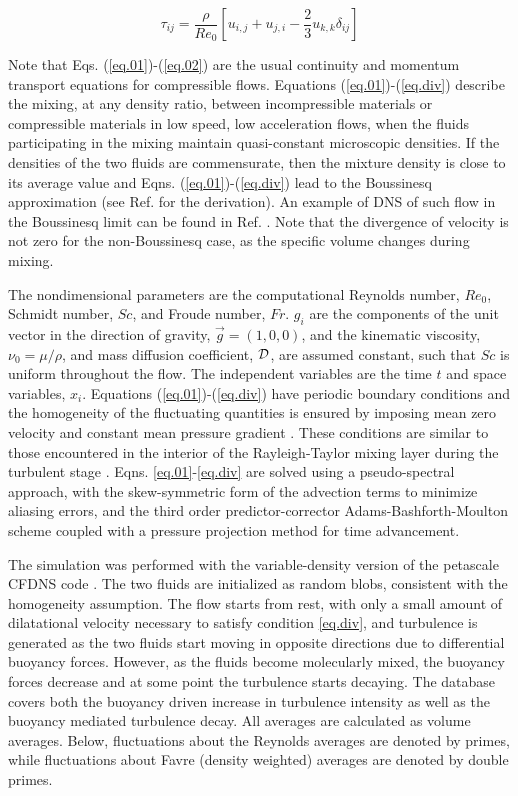 \documentclass[11pt]{article}
\def\twothird{\frac{2}{3}}
\begin{document}
\begin{equation}
\tau_{ij}=\frac{\rho}{Re_0}
[u_{i,j}+u_{j,i}-\twothird u_{k,k}\delta_{ij}]
\end{equation}

\noindent
Note that Eqs. (\ref{eq.01})-(\ref{eq.02}) are the usual continuity and 
momentum transport equations for compressible flows. Equations
(\ref{eq.01})-(\ref{eq.div}) describe the mixing, at any density ratio, between
incompressible materials or compressible materials in low speed, low 
acceleration flows, when the fluids participating in the mixing maintain 
quasi-constant microscopic densities. If the densities of the two fluids are 
commensurate, then the mixture density is close to its average value and 
Eqns. (\ref{eq.01})-(\ref{eq.div}) lead to the Boussinesq approximation
(see Ref. \cite{LR07} for the derivation). An example of DNS of such flow in 
the Boussinesq limit can be found in Ref. \cite{BCC92}. Note that the 
divergence of velocity is not zero for the non-Boussinesq case, as the specific
volume changes during mixing. 

The nondimensional parameters are the computational Reynolds number, $Re_0$, 
Schmidt number, $Sc$, and Froude number, $Fr$. $g_i$ are the components of the 
unit vector in the direction of gravity, $\vec{g}=(1,0,0)$, and the kinematic 
viscosity, $\nu_0=\mu/\rho$, and mass diffusion coefficient, $\cal{D}$, are 
assumed constant, such that $Sc$ is uniform throughout the flow. The 
independent variables are the time $t$ and space variables, $x_i$. Equations 
(\ref{eq.01})-(\ref{eq.div}) have periodic boundary conditions and the 
homogeneity of the fluctuating quantities is ensured by imposing mean zero 
velocity and constant mean pressure gradient \cite{LR07}. These conditions are 
similar to those encountered in the interior of the Rayleigh-Taylor mixing 
layer during the turbulent stage \cite{LRGDCC09}. Eqns. 
\ref{eq.01}-\ref{eq.div} are solved using a pseudo-spectral approach, with the 
skew-symmetric form of the advection terms to minimize aliasing errors, and the
third order predictor-corrector Adams-Bashforth-Moulton scheme coupled with a 
pressure projection method for time advancement. 

The simulation was performed with the variable-density version of the petascale
CFDNS code \cite{cfdns}. The two fluids are initialized as random blobs,
consistent with the homogeneity assumption. The flow starts from rest, with 
only a small amount of dilatational velocity necessary to satisfy condition
\ref{eq.div}, and turbulence is generated as the two fluids start moving in 
opposite directions due to differential buoyancy forces. However, as the fluids
become molecularly mixed, the buoyancy forces decrease and at some point the 
turbulence starts decaying. The database covers both the buoyancy driven 
increase in turbulence intensity as well as the buoyancy mediated turbulence 
decay. All averages are calculated as volume averages. Below, fluctuations
about the Reynolds averages are denoted by primes, while fluctuations about 
Favre (density weighted) averages are denoted by double primes.
\end{document}
